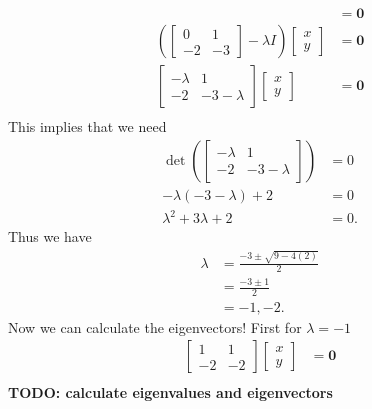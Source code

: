 \documentclass[10pt]{amsart}
\theoremstyle{nonumberplain}
\begin{document}
\begin{enumerate}[label={\bf {\arabic*}:}]
\begin{enumerate}
\begin{align*}
	&= \bm { 0 } \\
\left( \begin{bmatrix} 0 & 1 \\ -2 & -3 \end{bmatrix}
 - \lambda I \right)\begin{bmatrix} x \\ y \end{bmatrix}
	&= \bm { 0 } \\
\begin{bmatrix} -\lambda & 1 \\ -2 & -3 - \lambda \end{bmatrix}
\begin{bmatrix} x \\ y \end{bmatrix}
	&= \bm { 0 } \\
\end{align*}
This implies that we need
\begin{align*}
\det{ \left( \begin{bmatrix} -\lambda & 1 \\ -2 & -3 - \lambda \end{bmatrix} \right)} &= 0 \\
-\lambda(-3 -\lambda) + 2 &= 0 \\
\lambda^2 + 3\lambda + 2 &= 0.
\end{align*}
Thus we have
\begin{align*}
\lambda &= \frac{-3 \pm \sqrt{9 - 4(2)}} 2 \\
	&= \frac{-3 \pm 1} 2 \\
	&= -1, -2.
\end{align*}
Now we can calculate the eigenvectors!
First for $\lambda = -1$
\begin{align*}
\begin{bmatrix} 1 & 1 \\ -2 & -2 \end{bmatrix}
\begin{bmatrix} x \\ y \end{bmatrix}
	&= \bm { 0 } \\
\end{align*}
\textbf{TODO: calculate eigenvalues and eigenvectors} \\


\end{enumerate}
\end{enumerate}
\end{document}
